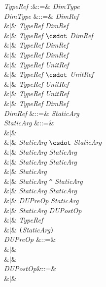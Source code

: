 \begin{Grammar}
\emph{TypeRef} :&:=& \emph{DimType}\\

\emph{DimType} &::=& \emph{DimRef} \\
&$|$& \emph{TypeRef} \emph{DimRef}\\
&$|$& \emph{TypeRef} $\csdot$ \emph{DimRef} \\
&$|$& \emph{TypeRef} \EXP{/} \emph{DimRef}\\
&$|$& \emph{TypeRef}  \emph{DimRef}\\
&$|$& \emph{TypeRef} \emph{UnitRef}\\
&$|$& \emph{TypeRef} $\csdot$ \emph{UnitRef} \\
&$|$& \emph{TypeRef} \EXP{/} \emph{UnitRef}\\
&$|$& \emph{TypeRef}  \emph{UnitRef}\\
&$|$& \emph{TypeRef}  \emph{DimRef}\\

\emph{DimRef} &::=& \emph{StaticArg} \\

\emph{StaticArg} &::=&  \\
&$|$& \\
&$|$& \emph{StaticArg} $\csdot$ \emph{StaticArg} \\
&$|$& \emph{StaticArg} \emph{StaticArg} \\
&$|$& \emph{StaticArg} \EXP{/} \emph{StaticArg}\\
&$|$& \EXP{/}\emph{StaticArg}\\
&$|$& \emph{StaticArg} \texttt{\^} \emph{StaticArg}\\
&$|$& \emph{StaticArg}  \emph{StaticArg}\\
&$|$& \emph{DUPreOp} \emph{StaticArg}\\
&$|$& \emph{StaticArg} \emph{DUPostOp}\\
&$|$& \emph{TypeRef} \\
&$|$& \texttt{(}\emph{StaticArg}\texttt{)} \\

\emph{DUPreOp} &::=& \\
&$|$&  \\
&$|$& \\

\emph{DUPostOp}&::=& \\
&$|$& \\

\end{Grammar}

